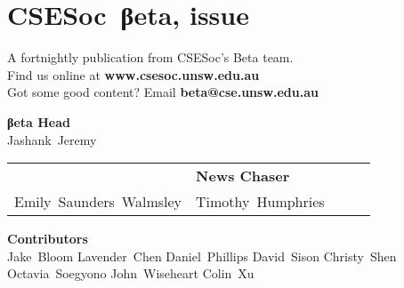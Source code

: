 \documentclass[twoside]{article}
\date{26 August 2015}
\makeatletter
\gdef\the@issue{110}
\makeatother
\begin{document}

\newpage
\maketitle\thispagestyle{mag}
\vspace*{-2em}\section*{CSE{}Soc~βeta, issue \makeatletter\the@issue}
\begin{multicols}{2}\begingroup\raggedcolumns
\begin{center}
A fortnightly publication from CSESoc's Beta team.\\
Find us online at \textbf{www.csesoc.unsw.edu.au}\\
Got some good content? Email \textbf{beta@cse.unsw.edu.au}\\
\par{\bf\sffamily βeta Head}\\ Jashank~Jeremy
\par\begin{tabular}{>{\raggedleft}p{0.5\linewidth}>{\raggedright}p{0.5\linewidth}}
{\bf\sffamily Puzzle Wrangler} & {\bf\sffamily News Chaser}\tabularnewline
Emily~Saunders~Walmsley & Timothy~Humphries\tabularnewline
\end{tabular}
\par{\bf\sffamily Contributors}\\
  Jake~Bloom\hsp{}
  Lavender~Chen\hsp{}
  Daniel~Phillips\hsp{}
  David~Sison\hsp{}
  Christy~Shen\hsp{}
  Octavia~Soegyono\hsp{}
  John~Wiseheart\hsp{}
  Colin~Xu\hsp{}
\end{center}
\columnbreak\malcontents\vfill\endgroup
\end{multicols}\LRmulticolcolumns
\vspace*{-4em}\begin{multicols}{2}


\end{multicols}
\end{document}
